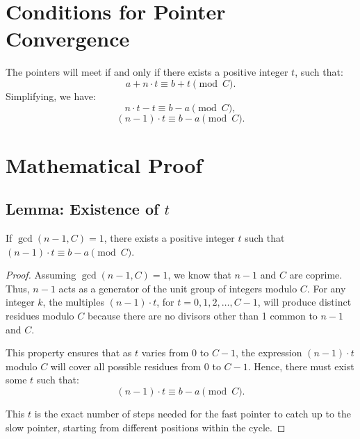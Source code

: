 \documentclass{article}
\begin{document}
\section{Conditions for Pointer Convergence}
The pointers will meet if and only if there exists a positive integer \( t \), such that:
\[
a + n \cdot t \equiv b + t \pmod{C}.
\]
Simplifying, we have:
\[
n \cdot t - t \equiv b - a \pmod{C},
\]
\[
(n - 1) \cdot t \equiv b - a \pmod{C}.
\]

\section{Mathematical Proof}
\subsection{Lemma: Existence of \( t \)}
\begin{lemma}
If \( \gcd(n - 1, C) = 1 \), there exists a positive integer \( t \) such that \( (n - 1) \cdot t \equiv b - a \pmod{C} \).
\end{lemma}

\begin{proof}
Assuming \( \gcd(n - 1, C) = 1 \), we know that \( n - 1 \) and \( C \) are coprime. Thus, \( n - 1 \) acts as a generator of the unit group of integers modulo \( C \). For any integer \( k \), the multiples \( (n - 1) \cdot t \), for \( t = 0, 1, 2, \ldots, C-1 \), will produce distinct residues modulo \( C \) because there are no divisors other than 1 common to \( n - 1 \) and \( C \). 

This property ensures that as \( t \) varies from 0 to \( C-1 \), the expression \( (n - 1) \cdot t \) modulo \( C \) will cover all possible residues from 0 to \( C-1 \). Hence, there must exist some \( t \) such that:
\[
(n - 1) \cdot t \equiv b - a \pmod{C}.
\]

This \( t \) is the exact number of steps needed for the fast pointer to catch up to the slow pointer, starting from different positions within the cycle.
\end{proof}
\end{document}
